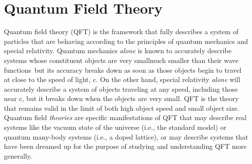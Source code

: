 \chapter{Quantum Field Theory}
\label{chap:QFT}

Quantum field theory (QFT) is the framework that fully describes a system of particles that are behaving according to the principles of quantum mechanics and special relativity. Quantum mechanics {\it alone} is known to accurately describe systems whose constituent objects are very small\textemdash much smaller than their wave functions~\cite{sakurai2011modern}\textemdash  but its accuracy breaks down as soon as those objects  begin to travel at close to the speed of light, c. On the other hand, special relativity {\it alone} will accurately describe a system of objects traveling at any speed, including those near c, but it breaks down when the objects are very small. QFT is the theory that remains valid in the limit of both high object speed and small object size. Quantum field {\it theories} are specific manifestations of QFT that may describe real systems like the vacuum state of the universe (i.e., the standard model) or quantum many-body systems (i.e., a doped lattice), or may describe systems that have been dreamed up for the purpose of studying and understanding QFT more generally.

